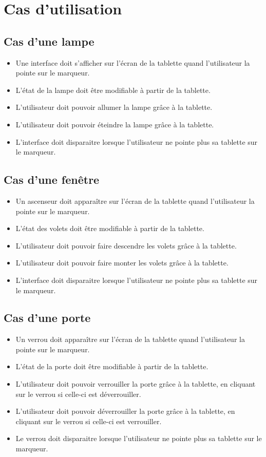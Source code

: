\documentclass[12pt,a4paper]{article}
\begin{document}
\section{Cas d'utilisation}
\subsection{Cas d'une lampe}

\begin{itemize}
  \item Une interface doit s'afficher sur l'écran de la tablette quand l'utilisateur la pointe sur le marqueur.
  \item L'état de la lampe doit être modifiable à partir de la tablette.
  \item L'utilisateur doit pouvoir allumer la lampe grâce à la tablette.
  \item L'utilisateur doit pouvoir éteindre la lampe grâce à la tablette.
  \item L'interface doit disparaitre lorsque l'utilisateur ne pointe plus sa tablette sur le marqueur.
\end{itemize}

\subsection{Cas d'une fenêtre}
\begin{itemize} 
  \item Un ascenseur doit apparaître sur l'écran de la tablette quand l'utilisateur la pointe sur le marqueur.
  \item L'état des volets doit être modifiable à partir de la tablette.
  \item L'utilisateur doit pouvoir faire descendre les volets grâce à la tablette.
  \item L'utilisateur doit pouvoir faire monter les volets grâce à la tablette.
  \item L'interface doit disparaitre lorsque l'utilisateur ne pointe plus sa tablette sur le marqueur.
\end{itemize}

\subsection{Cas d'une porte}
\begin{itemize} 
  \item Un verrou doit apparaître sur l'écran de la tablette quand l'utilisateur la pointe sur le marqueur.
  \item L'état de la porte doit être modifiable à partir de la tablette.
  \item L'utilisateur doit pouvoir verrouiller la porte grâce à la tablette, en cliquant sur le verrou si celle-ci est déverrouiller.
  \item L'utilisateur doit pouvoir déverrouiller la porte grâce à la tablette, en cliquant sur le verrou si celle-ci est verrouiller.
  \item Le verrou doit disparaitre lorsque l'utilisateur ne pointe plus sa tablette sur le marqueur.
\end{itemize}
\end{document}
